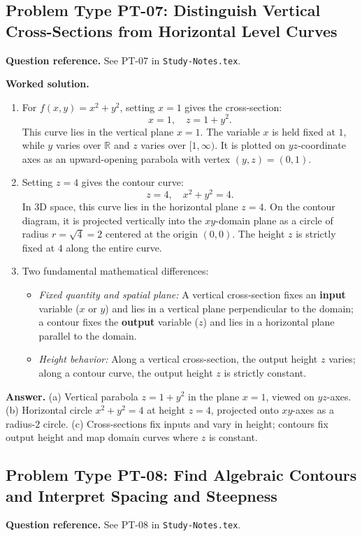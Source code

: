 \documentclass[11pt,letterpaper]{article}
\newcommand{\R}{\mathbb{R}}
\begin{document}
\subsection{Problem Type PT-07: Distinguish Vertical Cross-Sections from Horizontal Level Curves}
\textbf{Question reference.} See PT-07 in \texttt{Study-Notes.tex}.

\textbf{Worked solution.}
\begin{enumerate}[label=(\alph*),leftmargin=*]
    \item For $f(x,y) = x^2 + y^2$, setting $x = 1$ gives the cross-section:
    \[ x = 1, \quad z = 1 + y^2. \]
    This curve lies in the vertical plane $x = 1$. The variable $x$ is held fixed at $1$, while $y$ varies over $\R$ and $z$ varies over $[1,\infty)$. It is plotted on $yz$-coordinate axes as an upward-opening parabola with vertex $(y,z) = (0,1)$.
    \item Setting $z = 4$ gives the contour curve:
    \[ z = 4, \quad x^2 + y^2 = 4. \]
    In 3D space, this curve lies in the horizontal plane $z = 4$. On the contour diagram, it is projected vertically into the $xy$-domain plane as a circle of radius $r = \sqrt{4} = 2$ centered at the origin $(0,0)$. The height $z$ is strictly fixed at $4$ along the entire curve.
    \item Two fundamental mathematical differences:
    \begin{itemize}[nosep]
        \item \emph{Fixed quantity and spatial plane:} A vertical cross-section fixes an \textbf{input} variable ($x$ or $y$) and lies in a vertical plane perpendicular to the domain; a contour fixes the \textbf{output} variable ($z$) and lies in a horizontal plane parallel to the domain.
        \item \emph{Height behavior:} Along a vertical cross-section, the output height $z$ varies; along a contour curve, the output height $z$ is strictly constant.
    \end{itemize}
\end{enumerate}

\textbf{Answer.}
(a) Vertical parabola $z = 1+y^2$ in the plane $x=1$, viewed on $yz$-axes.
(b) Horizontal circle $x^2+y^2=4$ at height $z=4$, projected onto $xy$-axes as a radius-$2$ circle.
(c) Cross-sections fix inputs and vary in height; contours fix output height and map domain curves where $z$ is constant.

\subsection{Problem Type PT-08: Find Algebraic Contours and Interpret Spacing and Steepness}
\textbf{Question reference.} See PT-08 in \texttt{Study-Notes.tex}.
\end{document}

